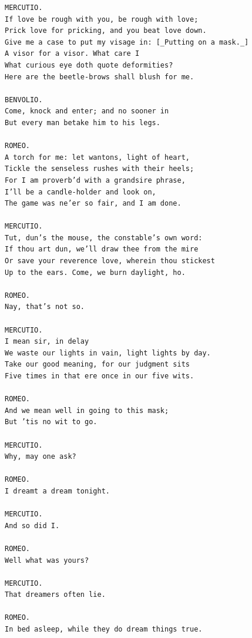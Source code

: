 \documentclass{article}
\begin{document}
\begin{verbatim}
MERCUTIO.
If love be rough with you, be rough with love;
Prick love for pricking, and you beat love down.
Give me a case to put my visage in: [_Putting on a mask._]
A visor for a visor. What care I
What curious eye doth quote deformities?
Here are the beetle-brows shall blush for me.

BENVOLIO.
Come, knock and enter; and no sooner in
But every man betake him to his legs.

ROMEO.
A torch for me: let wantons, light of heart,
Tickle the senseless rushes with their heels;
For I am proverb’d with a grandsire phrase,
I’ll be a candle-holder and look on,
The game was ne’er so fair, and I am done.

MERCUTIO.
Tut, dun’s the mouse, the constable’s own word:
If thou art dun, we’ll draw thee from the mire
Or save your reverence love, wherein thou stickest
Up to the ears. Come, we burn daylight, ho.

ROMEO.
Nay, that’s not so.

MERCUTIO.
I mean sir, in delay
We waste our lights in vain, light lights by day.
Take our good meaning, for our judgment sits
Five times in that ere once in our five wits.

ROMEO.
And we mean well in going to this mask;
But ’tis no wit to go.

MERCUTIO.
Why, may one ask?

ROMEO.
I dreamt a dream tonight.

MERCUTIO.
And so did I.

ROMEO.
Well what was yours?

MERCUTIO.
That dreamers often lie.

ROMEO.
In bed asleep, while they do dream things true.


\end{verbatim}
\end{document}
